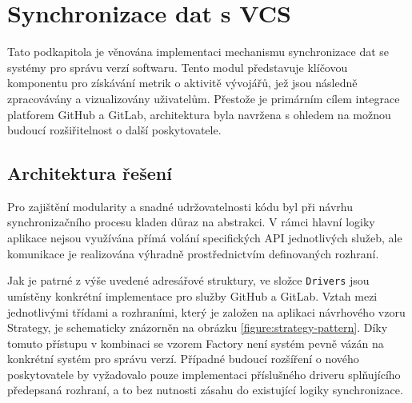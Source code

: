 \section{Synchronizace dat s VCS}
Tato podkapitola je věnována implementaci mechanismu synchronizace dat se systémy pro správu verzí softwaru. Tento modul představuje klíčovou komponentu pro získávání metrik o aktivitě vývojářů, jež jsou následně zpracovávány a vizualizovány uživatelům. Přestože je primárním cílem integrace platforem GitHub a GitLab, architektura byla navržena s ohledem na možnou budoucí rozšiřitelnost o další poskytovatele.

\newpage
\subsection{Architektura řešení}
Pro zajištění modularity a snadné udržovatelnosti kódu byl při návrhu synchronizačního procesu kladen důraz na abstrakci. V rámci hlavní logiky aplikace nejsou využívána přímá volání specifických API jednotlivých služeb, ale komunikace je realizována výhradně prostřednictvím definovaných rozhraní.


\vspace{10pt}

Jak je patrné z výše uvedené adresářové struktury, ve složce \texttt{Drivers} jsou umístěny konkrétní implementace pro služby GitHub a GitLab. Vztah mezi jednotlivými třídami a rozhraními, který je založen na aplikaci návrhového vzoru Strategy, je schematicky znázorněn na obrázku \ref{figure:strategy-pattern}. Díky tomuto přístupu v kombinaci se vzorem Factory není systém pevně vázán na konkrétní systém pro správu verzí. Případné budoucí rozšíření o nového poskytovatele by vyžadovalo pouze implementaci příslušného driveru splňujícího předepsaná rozhraní, a to bez nutnosti zásahu do existující logiky synchronizace.

